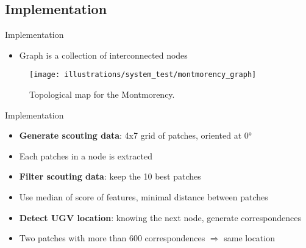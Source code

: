 \documentclass[aspectratio=169,hyperref={pdfpagelabels=false}]{beamer}
\begin{document}
    \subsection{Implementation}
    \begin{frame}{Implementation}
        \begin{itemize}
            \item Graph is a collection of interconnected nodes
        \end{itemize}
        \begin{figure}
            \centering
            \texttt{[image: illustrations/system\_test/montmorency\_graph]}
            \caption{Topological map for the Montmorency.}
        \end{figure}
    \end{frame}

    \begin{frame}{Implementation}
        \begin{itemize}
            \item \textbf{Generate scouting data}: 4x7 grid of patches, oriented at 0°
            \item Each patches in a node is extracted
            \pause
            \item \textbf{Filter scouting data}: keep the 10 best patches
            \item Use median of score of features, minimal distance between patches
            \pause
            \item \textbf{Detect UGV location}: knowing the next node, generate correspondences
            \item Two patches with more than 600 correspondences $\Rightarrow$ same location
        \end{itemize}
    \end{frame}
\end{document}
